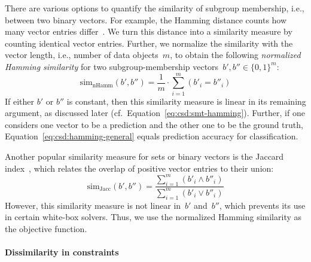 \documentclass{article}
\theoremstyle{definition}
\begin{document}
There are various options to quantify the similarity of subgroup membership, i.e., between two binary vectors.
For example, the Hamming distance counts how many vector entries differ~\cite{choi2010survey}.
We turn this distance into a similarity measure by counting identical vector entries.
Further, we normalize the similarity with the vector length, i.e., number of data objects~$m$, to obtain the following \emph{normalized Hamming similarity} for two subgroup-membership vectors~$b', b'' \in \{0, 1\}^m$:
%
\begin{equation}
	\text{sim}_{\text{nHamm}}(b', b'') = \frac{1}{m} \cdot \sum_{i=1}^{m} (b'_i = b''_i)
	\label{eq:csd:hamming-general}
\end{equation}
%
If either $b'$ or $b''$ is constant, then this similarity measure is linear in its remaining argument, as discussed later (cf.~Equation~\ref{eq:csd:smt-hamming}).
Further, if one considers one vector to be a prediction and the other one to be the ground truth, Equation~\ref{eq:csd:hamming-general} equals prediction accuracy for classification.

Another popular similarity measure for sets or binary vectors is the Jaccard index~\cite{choi2010survey}, which relates the overlap of positive vector entries to their union:
%
\begin{equation}
	\text{sim}_{\text{Jacc}}(b', b'') = \frac{\sum_{i=1}^{m} (b'_i \land b''_i)}{\sum_{i=1}^{m} (b'_i \lor b''_i)}
	\label{eq:csd:jaccard}
\end{equation}
%
However, this similarity measure is not linear in~$b'$ and~$b''$, which prevents its use in certain white-box solvers.
Thus, we use the normalized Hamming similarity as the objective function.

\paragraph{Dissimilarity in constraints}
\end{document}
